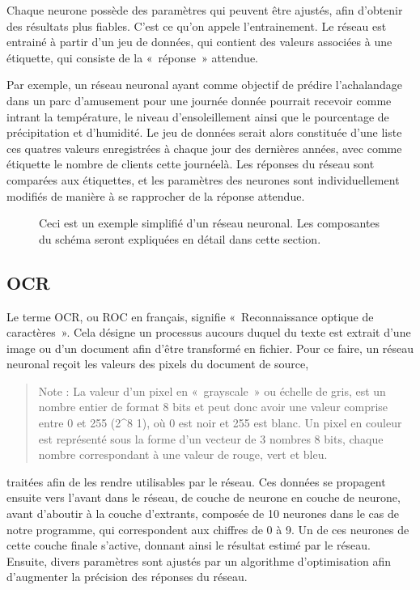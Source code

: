 \documentclass[letterpaper,10pt,french]{sphinxmanual}
\begin{document}
Chaque neurone possède des paramètres qui peuvent être ajustés, afin d’obtenir des résultats plus fiables. C’est ce qu’on appele l’entrainement.
Le réseau est entrainé à partir d’un jeu de données, qui contient des valeurs associées à une étiquette, qui consiste de la « réponse » attendue.

Par exemple, un réseau neuronal ayant comme objectif de prédire l’achalandage dans un parc d’amusement pour une journée donnée pourrait recevoir
comme intrant la température, le niveau d’ensoleillement ainsi que le pourcentage de précipitation et d’humidité. Le jeu de données serait alors
constituée d’une liste ces quatres valeurs enregistrées à chaque jour des dernières années, avec comme étiquette le nombre de clients cette journée\sphinxhyphen{}là.
Les réponses du réseau sont comparées aux étiquettes, et les paramètres des neurones sont individuellement modifiés de manière à se rapprocher de la réponse attendue.

\begin{figure}[htbp]
\centering
\capstart

\noindent{}
\caption{Ceci est un exemple simplifié d’un réseau neuronal. Les composantes du schéma seront expliquées en détail dans cette section.}\label{\detokenize{notions_de_base:reseau-neuronal}}\end{figure}


\subsection{OCR}
\label{\detokenize{notions_de_base:ocr}}
Le terme OCR, ou ROC en français, signifie « Reconnaissance optique de caractères ». Cela désigne un processus aucours duquel du texte est extrait
d’une image ou d’un document afin d’être transformé en fichier. Pour ce faire, un réseau neuronal reçoit les valeurs des pixels du document de source,
\begin{quote}

Note : La valeur d’un pixel en « grayscale » ou échelle de gris, est un nombre entier
de format 8 bits et peut donc avoir
une valeur comprise entre 0 et 255 (2\textasciicircum{}8 \sphinxhyphen{} 1), où 0 est noir et 255 est blanc.
Un pixel en couleur est représenté sous la forme d’un vecteur de 3 nombres 8
bits, chaque nombre correspondant à une valeur de rouge, vert et bleu. 
\end{quote}

traitées afin de les rendre utilisables par le réseau. Ces données se propagent ensuite vers l’avant
dans le réseau, de couche de neurone en couche de neurone, avant d’aboutir à la couche d’extrants, composée de 10 neurones dans le cas de notre
programme, qui correspondent aux chiffres de 0 à 9. Un de ces neurones de cette couche finale s’active, donnant ainsi le résultat estimé par le réseau.
Ensuite, divers paramètres sont ajustés par un algorithme d’optimisation afin d’augmenter la précision des réponses du réseau.
\end{document}
